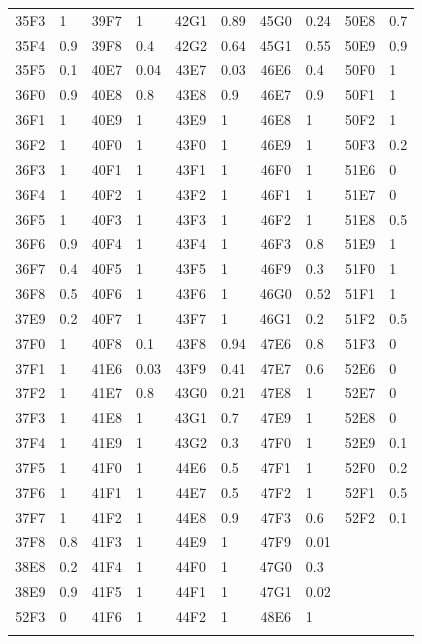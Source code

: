 \documentclass[a4paper 12pt]{article}
\numberwithin{equation}{section}
\begin{document}
{\begin{small}
\begin{table}[h!]
\begin{footnotesize}
\begin{tabular}{clclclclcl}
 35F3 &    1 & 39F7 &    1 & 42G1 & 0.89 & 45G0 & 0.24 & 50E8 &  0.7 \\ 
 35F4 &  0.9 & 39F8 &  0.4 & 42G2 & 0.64 & 45G1 & 0.55 & 50E9 &  0.9 \\ 
 35F5 &  0.1 & 40E7 & 0.04 & 43E7 & 0.03 & 46E6 &  0.4 & 50F0 &    1 \\ 
 36F0 &  0.9 & 40E8 &  0.8 & 43E8 &  0.9 & 46E7 &  0.9 & 50F1 &    1 \\ 
 36F1 &    1 & 40E9 &    1 & 43E9 &    1 & 46E8 &    1 & 50F2 &    1 \\ 
 36F2 &    1 & 40F0 &    1 & 43F0 &    1 & 46E9 &    1 & 50F3 &  0.2 \\ 
 36F3 &    1 & 40F1 &    1 & 43F1 &    1 & 46F0 &    1 & 51E6 &    0 \\ 
 36F4 &    1 & 40F2 &    1 & 43F2 &    1 & 46F1 &    1 & 51E7 &    0 \\ 
 36F5 &    1 & 40F3 &    1 & 43F3 &    1 & 46F2 &    1 & 51E8 &  0.5 \\ 
 36F6 &  0.9 & 40F4 &    1 & 43F4 &    1 & 46F3 &  0.8 & 51E9 &    1 \\ 
 36F7 &  0.4 & 40F5 &    1 & 43F5 &    1 & 46F9 &  0.3 & 51F0 &    1 \\ 
 36F8 &  0.5 & 40F6 &    1 & 43F6 &    1 & 46G0 & 0.52 & 51F1 &    1 \\ 
 37E9 &  0.2 & 40F7 &    1 & 43F7 &    1 & 46G1 &  0.2 & 51F2 &  0.5 \\ 
 37F0 &    1 & 40F8 &  0.1 & 43F8 & 0.94 & 47E6 &  0.8 & 51F3 &    0 \\ 
 37F1 &    1 & 41E6 & 0.03 & 43F9 & 0.41 & 47E7 &  0.6 & 52E6 &    0 \\ 
 37F2 &    1 & 41E7 &  0.8 & 43G0 & 0.21 & 47E8 &    1 & 52E7 &    0 \\ 
 37F3 &    1 & 41E8 &    1 & 43G1 &  0.7 & 47E9 &    1 & 52E8 &    0 \\ 
 37F4 &    1 & 41E9 &    1 & 43G2 &  0.3 & 47F0 &    1 & 52E9 &  0.1 \\ 
 37F5 &    1 & 41F0 &    1 & 44E6 &  0.5 & 47F1 &    1 & 52F0 &  0.2 \\ 
 37F6 &    1 & 41F1 &    1 & 44E7 &  0.5 & 47F2 &    1 & 52F1 &  0.5 \\ 
 37F7 &    1 & 41F2 &    1 & 44E8 &  0.9 & 47F3 &  0.6 & 52F2 &  0.1 \\ 
 37F8 &  0.8 & 41F3 &    1 & 44E9 &    1 & 47F9 & 0.01 &  &  \\ 
 38E8 &  0.2 & 41F4 &    1 & 44F0 &    1 & 47G0 &  0.3 &  &  \\ 
 38E9 &  0.9 & 41F5 &    1 & 44F1 &    1 & 47G1 & 0.02 &  &  \\ 
 52F3 &    0 & 41F6 &    1 & 44F2 &    1 & 48E6 &    1 &  &  \\ 
   \hline \\[0.8ex]
\end{tabular}
\label{tab:weights}
\end{footnotesize}
\end{table}
 \end{small}
 
}
\end{document}
